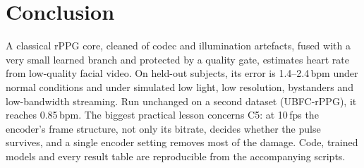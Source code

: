 \documentclass[conference]{IEEEtran}
\newcommand{\bpm}{\,bpm}
\begin{document}
\section{Conclusion}
A classical rPPG core, cleaned of codec and illumination artefacts, fused with a very small learned
branch and protected by a quality gate, estimates heart rate from low-quality facial video. On held-out
subjects, its error is 1.4--2.4\bpm{} under normal conditions and under simulated low light, low
resolution, bystanders and low-bandwidth streaming. Run unchanged on a second dataset (UBFC-rPPG), it
reaches 0.85\bpm. The biggest
practical lesson concerns C5: at 10\,fps the encoder's frame structure, not only its bitrate, decides
whether the pulse survives, and a single encoder setting removes most of the damage. Code, trained models and every result table are
reproducible from the accompanying scripts.
\end{document}
